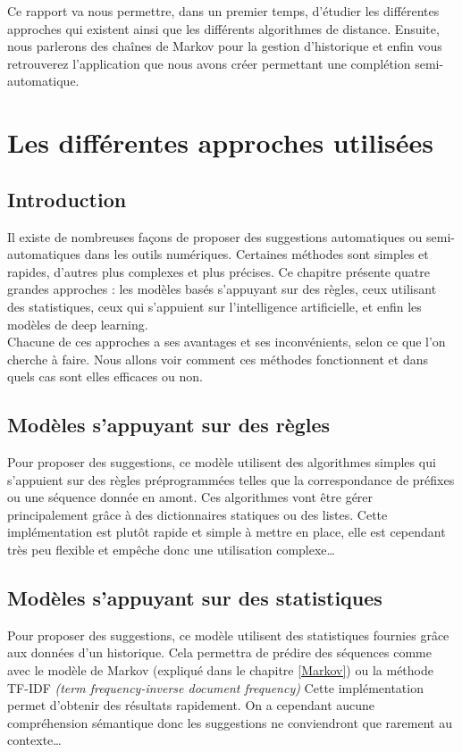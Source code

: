 \documentclass[a4paper, 11pt]{report}
\begin{document}
Ce rapport va nous permettre, dans un premier temps, d’étudier les différentes approches qui existent ainsi que  les différents algorithmes de distance. Ensuite, nous parlerons  des chaînes de Markov pour la gestion d'historique et enfin vous retrouverez l'application que nous avons créer permettant une complétion semi-automatique.\par
\vfill

\chapter{Les différentes approches utilisées}

\section{Introduction}

Il existe de nombreuses façons de proposer des suggestions automatiques ou semi-automatiques dans les outils numériques. Certaines méthodes sont simples et rapides, d’autres plus complexes et plus précises. Ce chapitre présente quatre grandes approches : les modèles basés s'appuyant sur des règles, ceux utilisant des statistiques, ceux qui s’appuient sur l’intelligence artificielle, et enfin les modèles de deep learning. \\

Chacune de ces approches a ses avantages et ses inconvénients, selon ce que l’on cherche à faire. Nous allons voir comment ces méthodes fonctionnent et dans quels cas sont elles efficaces ou non.

\section{Modèles s'appuyant sur des règles}
Pour proposer des suggestions, ce modèle utilisent des algorithmes simples qui s'appuient sur des règles préprogrammées telles que la correspondance de préfixes ou une séquence donnée en amont. Ces algorithmes vont être gérer principalement grâce à des dictionnaires statiques ou des listes.  Cette implémentation est plutôt rapide et simple à mettre en place, elle est cependant très peu flexible et empêche donc une utilisation complexe\dots

\section{Modèles s'appuyant sur des statistiques}
Pour proposer des suggestions, ce modèle utilisent des statistiques fournies grâce aux données d'un historique. Cela permettra de prédire des séquences comme avec le modèle de Markov (expliqué dans le chapitre \ref{Markov}) ou la méthode TF-IDF \textit{(term frequency-inverse document frequency)}
Cette implémentation permet d'obtenir des résultats rapidement. On a cependant aucune compréhension sémantique donc les suggestions ne conviendront que rarement au contexte\dots
\newpage
\end{document}
